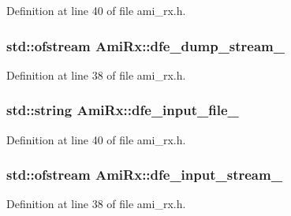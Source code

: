 Definition at line 40 of file ami\+\_\+rx.\+h.

\hypertarget{class_ami_rx_a7498677c54b51e987e00b5e692ecedaf}{}
\subsubsection[{dfe\+\_\+dump\+\_\+stream\+\_\+}]{\setlength{\rightskip}{0pt plus 5cm}std\+::ofstream Ami\+Rx\+::dfe\+\_\+dump\+\_\+stream\+\_\+\hspace{0.3cm}{\ttfamily [protected]}}\label{class_ami_rx_a7498677c54b51e987e00b5e692ecedaf}


Definition at line 38 of file ami\+\_\+rx.\+h.

\hypertarget{class_ami_rx_a57786bfc4be423b3cfccc03081b6bb50}{}
\subsubsection[{dfe\+\_\+input\+\_\+file\+\_\+}]{\setlength{\rightskip}{0pt plus 5cm}std\+::string Ami\+Rx\+::dfe\+\_\+input\+\_\+file\+\_\+\hspace{0.3cm}{\ttfamily [protected]}}\label{class_ami_rx_a57786bfc4be423b3cfccc03081b6bb50}


Definition at line 40 of file ami\+\_\+rx.\+h.

\hypertarget{class_ami_rx_a4032ef1f57bf4b5aef5cb481ea65622c}{}
\subsubsection[{dfe\+\_\+input\+\_\+stream\+\_\+}]{\setlength{\rightskip}{0pt plus 5cm}std\+::ofstream Ami\+Rx\+::dfe\+\_\+input\+\_\+stream\+\_\+\hspace{0.3cm}{\ttfamily [protected]}}\label{class_ami_rx_a4032ef1f57bf4b5aef5cb481ea65622c}


Definition at line 38 of file ami\+\_\+rx.\+h.

\hypertarget{class_ami_rx_a2bda560b4aa1312dcd9654294b1d7e76}{}
